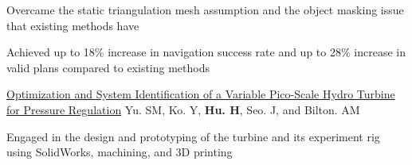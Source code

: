 \begin{cventries}
{\begin{cvitems}
      \item {Overcame the static triangulation mesh assumption and the object masking issue that existing methods have
      }
      \item {Achieved up to 18\% increase in navigation success rate and up to 28\% increase in valid plans compared to existing methods}
    \end{cvitems}
    }
  \cvpublicationentrysimple
    {\href{https://asmedigitalcollection.asme.org/POWER/proceedings-abstract/POWER2020/83747/V001T08A020/1088386}{Optimization and System Identification of a Variable Pico-Scale Hydro Turbine for Pressure Regulation}} %
    {Yu. SM, Ko. Y, \textbf{Hu. H}, Seo. J, and Bilton. AM \hspace*{0pt}\hfill {}} %
    {
    \begin{cvitems}
      \item Engaged in the design and prototyping of the turbine and its experiment rig using SolidWorks, machining, and 3D printing
    \end{cvitems}
    }
\end{cventries}









